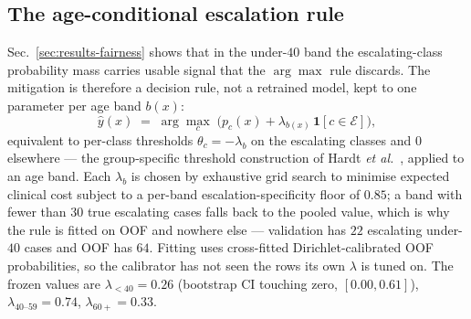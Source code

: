 \documentclass[journal]{IEEEtran}
\begin{document}
\subsection{The age-conditional escalation rule}
\label{sec:agerule}
Sec.~\ref{sec:results-fairness} shows that in the under-$40$ band the escalating-class
probability mass carries usable signal that the $\arg\max$ rule discards. The mitigation is
therefore a decision rule, not a retrained model, kept to one parameter per age band $b(x)$:
\begin{equation}
\hat{y}(x) \;=\; \arg\max_{c}\;\bigl(p_c(x) + \lambda_{b(x)}\,\mathbf{1}[c \in \mathcal{E}]\bigr),
\label{eq:lambda}
\end{equation}
equivalent to per-class thresholds $\theta_c=-\lambda_b$ on the escalating classes and $0$
elsewhere --- the group-specific threshold construction of Hardt \emph{et
al.}~\cite{hardt2016equality}, applied to an age band. Each $\lambda_b$ is chosen by exhaustive
grid search to minimise expected clinical cost subject to a per-band escalation-specificity
floor of $0.85$; a band with fewer than $30$ true escalating cases falls back to the pooled
value, which is why the rule is fitted on OOF and nowhere else --- validation has $22$
escalating under-$40$ cases and OOF has $64$. Fitting uses cross-fitted Dirichlet-calibrated
OOF probabilities, so the calibrator has not seen the rows its own $\lambda$ is tuned on. The
frozen values are $\lambda_{<40}=0.26$ (bootstrap CI touching zero, $[0.00,0.61]$),
$\lambda_{40\text{--}59}=0.74$, $\lambda_{60+}=0.33$.
\end{document}
